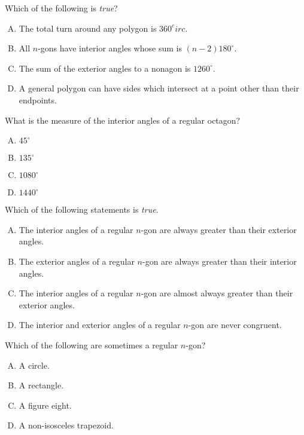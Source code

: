 \documentclass[12pt,letterpaper]{exam}
\begin{document}
\begin{questions}
\vfill



\question Which of the following is \textit{true}?
        \begin{enumerate}[A.]
        \item The total turn around any polygon is $360^circ$.
        \item All $n$-gons have interior angles whose sum is $(n - 2)180^\circ$.
        \item The sum of the exterior angles to a nonagon is $1260^\circ$.
        \item A general polygon can have sides which intersect at a point other than their endpoints. 
        \end{enumerate}



\vfill



\question What is the measure of the interior angles of a regular octagon?
        \begin{enumerate}[A.]
        \item $45^\circ$
        \item $135^\circ$
        \item $1080^\circ$
        \item $1440^\circ$
        \end{enumerate}



\vfill



\question Which of the following statements is \textit{true}. 
        \begin{enumerate}[A.]
        \item The interior angles of a regular $n$-gon are always greater than their exterior angles.
        \item The exterior angles of a regular $n$-gon are always greater than their interior angles.
        \item The interior angles of a regular $n$-gon are almost always greater than their exterior angles.
        \item The interior and exterior angles of a regular $n$-gon are never congruent. 
        \end{enumerate}



\vfill



\question Which of the following are sometimes a regular $n$-gon?
        \begin{enumerate}[A.]
        \item A circle.
        \item A rectangle. 
        \item A figure eight.
        \item A non-isosceles trapezoid. 
        \end{enumerate}




\end{questions}
\end{document}
